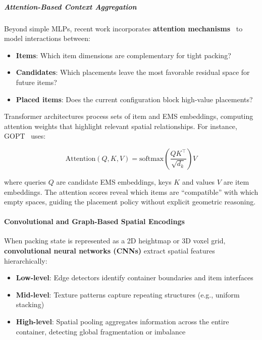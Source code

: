 \subparagraph{Attention-Based Context Aggregation}

Beyond simple MLPs, recent work incorporates \textbf{attention mechanisms}~\cite{XGP24} to model interactions between:

\begin{itemize}
    \item \textbf{Items}: Which item dimensions are complementary for tight packing?
    \item \textbf{Candidates}: Which placements leave the most favorable residual space for future items?
    \item \textbf{Placed items}: Does the current configuration block high-value placements?
\end{itemize}

Transformer architectures process sets of item and EMS embeddings, computing attention weights that highlight relevant spatial relationships. For instance, GOPT~\cite{XGP24} uses:

\begin{equation}
\text{Attention}(Q, K, V) = \text{softmax}\left(\frac{QK^\top}{\sqrt{d_k}}\right) V
\end{equation}

where queries $Q$ are candidate EMS embeddings, keys $K$ and values $V$ are item embeddings. The attention scores reveal which items are ``compatible'' with which empty spaces, guiding the placement policy without explicit geometric reasoning.


\paragraph{Convolutional and Graph-Based Spatial Encodings}

When packing state is represented as a 2D heightmap or 3D voxel grid, \textbf{convolutional neural networks (CNNs)} extract spatial features hierarchically:

\begin{itemize}
    \item \textbf{Low-level}: Edge detectors identify container boundaries and item interfaces
    \item \textbf{Mid-level}: Texture patterns capture repeating structures (e.g., uniform stacking)
    \item \textbf{High-level}: Spatial pooling aggregates information across the entire container, detecting global fragmentation or imbalance
\end{itemize}

